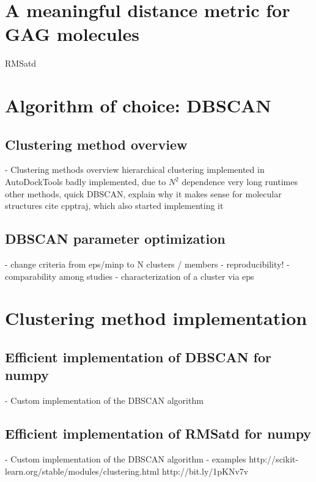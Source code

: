 \section{A meaningful distance metric for GAG molecules}
RMSatd

\lipsum[1-2]


\section{Algorithm of choice: DBSCAN}

\lipsum[1-2]

\subsection{Clustering method overview}

    - Clustering methods overview
        hierarchical clustering implemented in AutoDockTools
            badly implemented, due to $N^2$ dependence very long runtimes
        other methods, quick
        DBSCAN, explain why it makes sense for molecular structures
        cite cpptraj, which also started implementing it

\subsection{DBSCAN parameter optimization}

    - change criteria from eps/minp to N clusters / members
    - reproducibility!
    - comparability among studies
    - characterization of a cluster via eps


\section{Clustering method implementation}

\subsection{Efficient implementation of DBSCAN for numpy}

        - Custom implementation of the DBSCAN algorithm

\subsection{Efficient implementation of RMSatd for numpy}

        - Custom implementation of the DBSCAN algorithm
        - examples
            http://scikit-learn.org/stable/modules/clustering.html
            http://bit.ly/1pKNv7v


